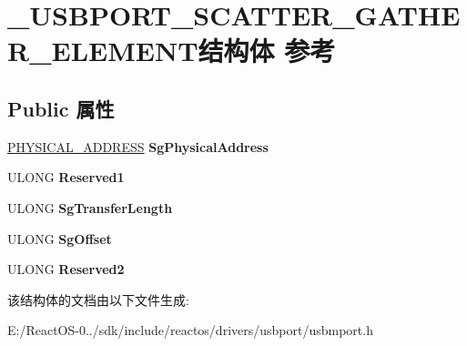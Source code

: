 \hypertarget{struct___u_s_b_p_o_r_t___s_c_a_t_t_e_r___g_a_t_h_e_r___e_l_e_m_e_n_t}{}\section{\+\_\+\+U\+S\+B\+P\+O\+R\+T\+\_\+\+S\+C\+A\+T\+T\+E\+R\+\_\+\+G\+A\+T\+H\+E\+R\+\_\+\+E\+L\+E\+M\+E\+N\+T结构体 参考}
\label{struct___u_s_b_p_o_r_t___s_c_a_t_t_e_r___g_a_t_h_e_r___e_l_e_m_e_n_t}
\subsection*{Public 属性}
\begin{DoxyCompactItemize}
\item 
\mbox{\label{struct___u_s_b_p_o_r_t___s_c_a_t_t_e_r___g_a_t_h_e_r___e_l_e_m_e_n_t_a49ce92fa6d0cebe212bd0059b44a5556}} 
\hyperlink{union___l_a_r_g_e___i_n_t_e_g_e_r}{P\+H\+Y\+S\+I\+C\+A\+L\+\_\+\+A\+D\+D\+R\+E\+SS} {\bfseries Sg\+Physical\+Address}
\item 
\mbox{\label{struct___u_s_b_p_o_r_t___s_c_a_t_t_e_r___g_a_t_h_e_r___e_l_e_m_e_n_t_a4f06fa8323ff3c9c7658ec2f76897bf2}} 
U\+L\+O\+NG {\bfseries Reserved1}
\item 
\mbox{\label{struct___u_s_b_p_o_r_t___s_c_a_t_t_e_r___g_a_t_h_e_r___e_l_e_m_e_n_t_ae3084788e5a295d3fcf6bc4239c23f83}} 
U\+L\+O\+NG {\bfseries Sg\+Transfer\+Length}
\item 
\mbox{\label{struct___u_s_b_p_o_r_t___s_c_a_t_t_e_r___g_a_t_h_e_r___e_l_e_m_e_n_t_a72f7aecd18acdee043c9c0fa30f5044c}} 
U\+L\+O\+NG {\bfseries Sg\+Offset}
\item 
\mbox{\label{struct___u_s_b_p_o_r_t___s_c_a_t_t_e_r___g_a_t_h_e_r___e_l_e_m_e_n_t_a907fd70f129c2b0cacd597726ae3dd52}} 
U\+L\+O\+NG {\bfseries Reserved2}
\end{DoxyCompactItemize}


该结构体的文档由以下文件生成\+:\begin{DoxyCompactItemize}
\item 
E\+:/\+React\+O\+S-\/0../sdk/include/reactos/drivers/usbport/usbmport.\+h\end{DoxyCompactItemize}
